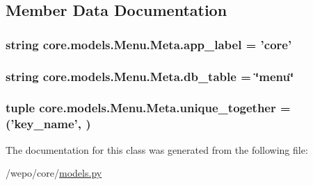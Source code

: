 \subsection{Member Data Documentation}
\hypertarget{classcore_1_1models_1_1Menu_1_1Meta_a4089d7260846eaa663415d91839cbd07}{
\subsubsection[{app\-\_\-label}]{\setlength{\rightskip}{0pt plus 5cm}string core.\-models.\-Menu.\-Meta.\-app\-\_\-label = 'core'\hspace{0.3cm}{\ttfamily [static]}}}\label{classcore_1_1models_1_1Menu_1_1Meta_a4089d7260846eaa663415d91839cbd07}
\hypertarget{classcore_1_1models_1_1Menu_1_1Meta_ae37629c74181c6f94c7e5fd523c7527a}{
\subsubsection[{db\-\_\-table}]{\setlength{\rightskip}{0pt plus 5cm}string core.\-models.\-Menu.\-Meta.\-db\-\_\-table = \char`\"{}menu\char`\"{}\hspace{0.3cm}{\ttfamily [static]}}}\label{classcore_1_1models_1_1Menu_1_1Meta_ae37629c74181c6f94c7e5fd523c7527a}
\hypertarget{classcore_1_1models_1_1Menu_1_1Meta_a36d296a64f7041e3655f655aef2b865c}{
\subsubsection[{unique\-\_\-together}]{\setlength{\rightskip}{0pt plus 5cm}tuple core.\-models.\-Menu.\-Meta.\-unique\-\_\-together = ('{\bf key\-\_\-name}', )\hspace{0.3cm}{\ttfamily [static]}}}\label{classcore_1_1models_1_1Menu_1_1Meta_a36d296a64f7041e3655f655aef2b865c}


The documentation for this class was generated from the following file\-:\begin{DoxyCompactItemize}
\item 
/wepo/core/\hyperlink{models_8py}{models.\-py}\end{DoxyCompactItemize}
